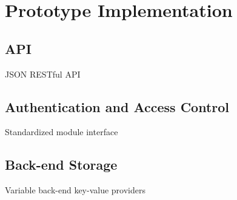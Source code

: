 \section{Prototype Implementation}

\subsection{API}

JSON RESTful API

\subsection{Authentication and Access Control}

Standardized module interface

\subsection{Back-end Storage}

Variable back-end key-value providers

